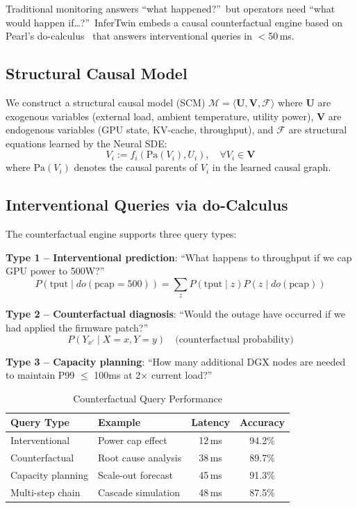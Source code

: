 \documentclass[conference,10pt]{IEEEtran}
\begin{document}
Traditional monitoring answers ``what happened?''\ but operators need ``what would happen if\ldots?''\ InferTwin embeds a causal counterfactual engine based on Pearl's do-calculus~\cite{pearl2009causality} that answers interventional queries in $<$50\,ms.

\subsection{Structural Causal Model}

We construct a structural causal model (SCM) $\mathcal{M} = \langle \mathbf{U}, \mathbf{V}, \mathcal{F} \rangle$ where $\mathbf{U}$ are exogenous variables (external load, ambient temperature, utility power), $\mathbf{V}$ are endogenous variables (GPU state, KV-cache, throughput), and $\mathcal{F}$ are structural equations learned by the Neural SDE:
\begin{equation}
V_i := f_i(\text{Pa}(V_i), U_i), \quad \forall V_i \in \mathbf{V}
\end{equation}
where $\text{Pa}(V_i)$ denotes the causal parents of $V_i$ in the learned causal graph.

\subsection{Interventional Queries via do-Calculus}

The counterfactual engine supports three query types:

\textbf{Type 1 -- Interventional prediction}: ``What happens to throughput if we cap GPU power to 500W?''
\begin{equation}
P(\text{tput} \mid do(\text{pcap}{=}500)) = \textstyle\sum_{z} P(\text{tput} \mid z) P(z \mid do(\text{pcap}))
\end{equation}

\textbf{Type 2 -- Counterfactual diagnosis}: ``Would the outage have occurred if we had applied the firmware patch?''
\begin{equation}
P(Y_{x'} \mid X{=}x, Y{=}y) \quad \text{(counterfactual probability)}
\end{equation}

\textbf{Type 3 -- Capacity planning}: ``How many additional DGX nodes are needed to maintain P99 $\leq$ 100ms at 2$\times$ current load?''

\begin{table}[!htbp]
\caption{Counterfactual Query Performance}
\label{tab:causal_perf}
\centering\scriptsize
\begin{tabular}{@{}llcc@{}}
\toprule
\textbf{Query Type} & \textbf{Example} & \textbf{Latency} & \textbf{Accuracy} \\
\midrule
Interventional & Power cap effect & 12\,ms & 94.2\% \\
Counterfactual & Root cause analysis & 38\,ms & 89.7\% \\
Capacity planning & Scale-out forecast & 45\,ms & 91.3\% \\
Multi-step chain & Cascade simulation & 48\,ms & 87.5\% \\
\bottomrule
\end{tabular}
\end{table}
\end{document}
